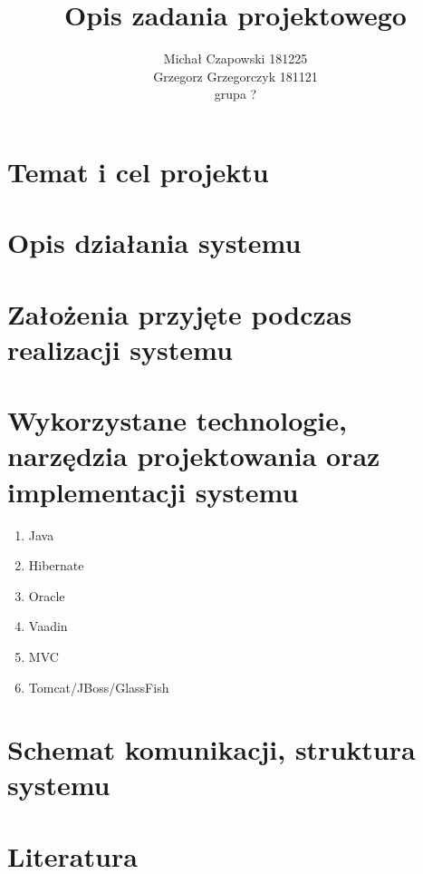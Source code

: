 \documentclass[a4paper,10pt]{article}
\title{Opis zadania projektowego}
\author{Michał Czapowski 181225\\Grzegorz Grzegorczyk 181121\\grupa ?}
\begin{document}
\maketitle


\section{Temat i cel projektu}

\section{Opis działania systemu}
\section{Założenia przyjęte podczas realizacji systemu}
\section{Wykorzystane technologie, narzędzia projektowania oraz implementacji systemu}
\begin{enumerate}
\item{Java}
\item{Hibernate}
\item{Oracle}
\item{Vaadin}
\item{MVC}
\item{Tomcat/JBoss/GlassFish}
\end{enumerate}

\section{Schemat komunikacji, struktura systemu}

\section{Literatura}
\end{document}
